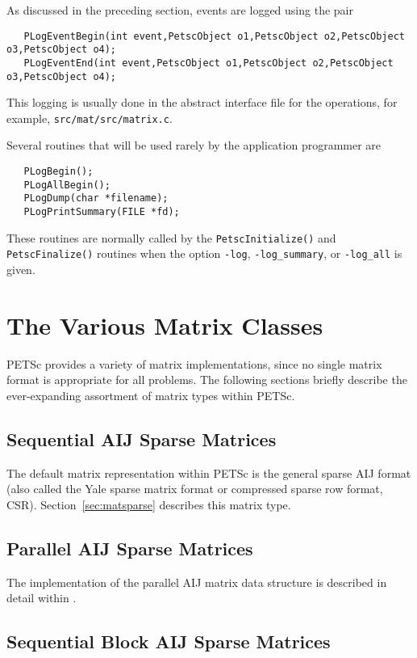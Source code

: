 As discussed in the preceding section, events are logged using the 
pair 
\begin{verbatim}
   PLogEventBegin(int event,PetscObject o1,PetscObject o2,PetscObject o3,PetscObject o4);
   PLogEventEnd(int event,PetscObject o1,PetscObject o2,PetscObject o3,PetscObject o4);
\end{verbatim}
This logging is usually done in the abstract
interface file for the operations, for example, {\tt src/mat/src/matrix.c}.

Several routines that will be used rarely by the 
application programmer 
are    
\begin{verbatim}
   PLogBegin();
   PLogAllBegin();
   PLogDump(char *filename);
   PLogPrintSummary(FILE *fd);
\end{verbatim}
These routines are normally called by the {\tt PetscInitialize()}
and {\tt PetscFinalize()} routines when the option {\tt -log}, 
{\tt -log\_summary}, or 
{\tt -log\_all} is given.

\section{The Various Matrix Classes}
\label{sec:matclasses}

PETSc provides a variety of matrix implementations, since no single
matrix format is appropriate for all problems. The following sections
briefly describe the ever-expanding assortment of matrix types within PETSc.

\subsection{Sequential AIJ Sparse Matrices}

The default matrix representation within PETSc is the general sparse
AIJ format (also called the Yale sparse matrix format or compressed
sparse row format, CSR). Section~\ref{sec:matsparse} describes this
matrix type.

\subsection{Parallel AIJ Sparse Matrices}

The implementation of the parallel AIJ matrix data structure is 
described in detail within \cite{petsc-mpi-paper}.

\subsection{Sequential Block AIJ Sparse Matrices}

